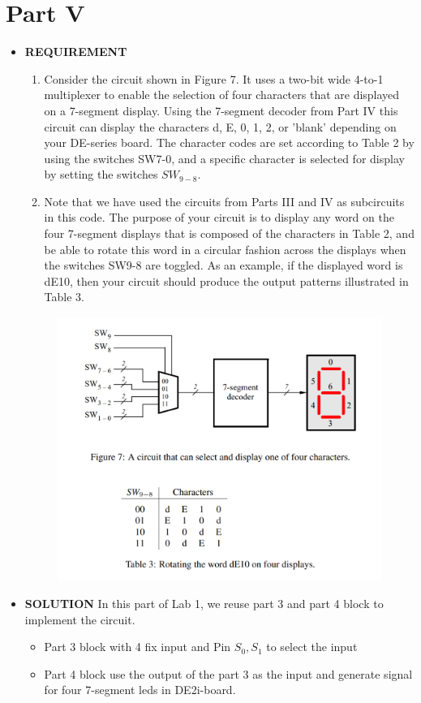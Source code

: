 \section{Part V }
\begin{itemize}
    \item [] \textbf{REQUIREMENT}
        \begin{enumerate}
            \item Consider the circuit shown in Figure 7. It uses a two-bit wide 4-to-1 multiplexer to enable the selection of four characters that are displayed on a 7-segment display. Using the 7-segment decoder from Part IV this circuit can display the characters d, E, 0, 1, 2, or 'blank' depending on your DE-series board. The character codes are set according to Table 2 by using the switches SW7-0, and a specific character is selected for display by setting the switches $SW_{9-8}$.
            \item Note that we have used the circuits from Parts III and IV as subcircuits in this code. The purpose of your circuit is to display any word on the four 7-segment displays that is composed of the characters in Table 2, and be able to rotate this word in a circular fashion across the displays when the switches SW9-8 are toggled. As an example, if the displayed word is dE10, then your circuit should produce the output patterns illustrated in Table 3.
        \end{enumerate}
        \begin{figure}[h]
            \centering
            \includegraphics[scale =0.40]{source/picture/Lab1/1-5.png}
        \end{figure}
    \item [] \textbf{SOLUTION} In this part of Lab 1, we reuse part 3 and part 4  block to implement the circuit. 
        \begin{itemize}
            \item [] Part 3 block with 4 fix input and Pin $S_0, S_1$ to select the input
            \item [] Part 4 block use the output of the part 3 as the input and generate signal for four 7-segment leds in DE2i-board.
        \end{itemize}
         
\end{itemize}
